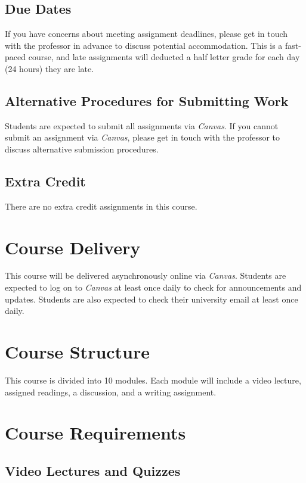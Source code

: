 \documentclass[11pt, letterpaper]{article}
\begin{document}
\subsection*{Due Dates}
If you have concerns about meeting assignment deadlines, please get in touch with the professor in advance to discuss potential accommodation. This is a fast-paced course, and late assignments will deducted a half letter grade for each day (24 hours) they are late.

\subsection*{Alternative Procedures for Submitting Work}
Students are expected to submit all assignments via \emph{Canvas}. If you cannot submit an assignment via \emph{Canvas}, please get in touch with the professor to discuss alternative submission procedures.

\subsection*{Extra Credit}
There are no extra credit assignments in this course. 

\section*{Course Delivery}

This course will be delivered asynchronously online via \emph{Canvas}. Students are expected to log on to \emph{Canvas} at least once daily to check for announcements and updates. Students are also expected to check their university email at least once daily.

\section*{Course Structure}

This course is divided into 10 modules. Each module will include a video lecture, assigned readings, a discussion, and a writing assignment. 
\section*{Course Requirements}

\subsection*{Video Lectures and Quizzes}
\end{document}
